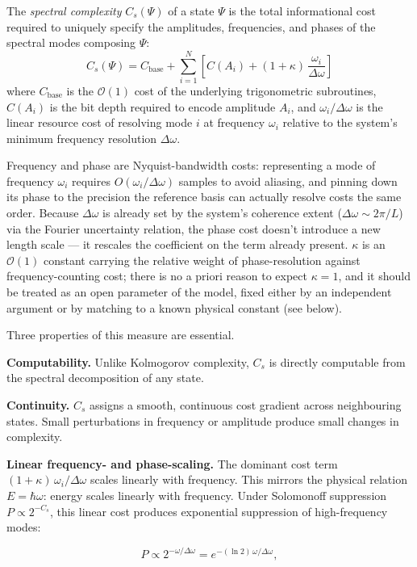 \documentclass[11pt]{article}
\begin{document}
\begin{definition}
The \emph{spectral complexity} $C_s(\Psi)$ of a state $\Psi$ is the total
informational cost required to uniquely specify the amplitudes, frequencies,
and phases of the spectral modes composing $\Psi$:
\[
C_s(\Psi) = C_{\mathrm{base}} + \sum_{i=1}^{N}
\left[ C(A_i) + (1+\kappa)\,\frac{\omega_i}{\Delta\omega} \right]
\]
where $C_{\mathrm{base}}$ is the $\mathcal{O}(1)$ cost of the underlying
trigonometric subroutines, $C(A_i)$ is the bit depth required to encode
amplitude $A_i$, and $\omega_i/\Delta\omega$ is the linear resource cost of
resolving mode $i$ at frequency $\omega_i$ relative to the system's minimum
frequency resolution $\Delta\omega$.

Frequency and phase are Nyquist-bandwidth costs: representing a mode of
frequency $\omega_i$ requires $O(\omega_i/\Delta\omega)$ samples to avoid
aliasing, and pinning down its phase to the precision the reference basis
can actually resolve costs the same order. Because $\Delta\omega$ is already
set by the system's coherence extent ($\Delta\omega \sim 2\pi/L$) via the
Fourier uncertainty relation, the phase cost doesn't introduce a new length
scale — it rescales the coefficient on the term already present. $\kappa$
is an $\mathcal{O}(1)$ constant carrying the relative weight of
phase-resolution against frequency-counting cost; there is no a priori
reason to expect $\kappa=1$, and it should be treated as an open parameter
of the model, fixed either by an independent argument or by matching to a
known physical constant (see below).
\end{definition}

Three properties of this measure are essential.

\textbf{Computability.} Unlike Kolmogorov complexity, $C_s$ is directly
computable from the spectral decomposition of any state.

\textbf{Continuity.} $C_s$ assigns a smooth, continuous cost gradient
across neighbouring states. Small perturbations in frequency or amplitude
produce small changes in complexity.

\textbf{Linear frequency- and phase-scaling.} The dominant cost term
$(1+\kappa)\,\omega_i/\Delta\omega$ scales linearly with frequency. This
mirrors the physical relation $E=\hbar\omega$: energy scales linearly with
frequency. Under Solomonoff suppression $P \propto 2^{-C_s}$, this linear
cost produces exponential suppression of high-frequency modes:

\[
P \propto 2^{-\omega/\Delta\omega} = e^{-(\ln 2)\,\omega/\Delta\omega},
\]
\end{document}
